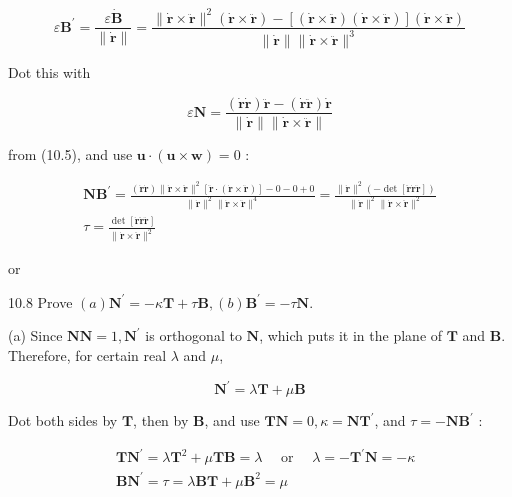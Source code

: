 \documentclass[10pt]{article}
\begin{document}
$$
\varepsilon \mathbf{B}^{\prime}=\frac{\varepsilon \dot{\mathbf{B}}}{\|\dot{\mathbf{r}}\|}=\frac{\|\dot{\mathbf{r}} \times \ddot{\mathbf{r}}\|^{2}(\dot{\mathbf{r}} \times \ddot{\mathbf{r}})-[(\dot{\mathbf{r}} \times \ddot{\mathbf{r}})(\dot{\mathbf{r}} \times \ddot{\mathbf{r}})](\dot{\mathbf{r}} \times \ddot{\mathbf{r}})}{\|\dot{\mathbf{r}}\|\|\dot{\mathbf{r}} \times \ddot{\mathbf{r}}\|^{3}}
$$

Dot this with

$$
\varepsilon \mathbf{N}=\frac{(\dot{\mathbf{r}} \dot{\mathbf{r}}) \ddot{\mathbf{r}}-(\dot{\mathbf{r}} \ddot{\mathbf{r}}) \dot{\mathbf{r}}}{\|\dot{\mathbf{r}}\|\|\dot{\mathbf{r}} \times \ddot{\mathbf{r}}\|}
$$

from (10.5), and use $\mathbf{u} \cdot(\mathbf{u} \times \mathbf{w})=0$ :

$$
\begin{gathered}
\mathbf{N B}^{\prime}=\frac{(\dot{\mathbf{r}} \dot{\mathbf{r}})\|\dot{\mathbf{r}} \times \ddot{\mathbf{r}}\|^{2}[\ddot{\mathbf{r}} \cdot(\dot{\mathbf{r}} \times \ddot{\mathbf{r}})]-0-0+0}{\|\dot{\mathbf{r}}\|^{2}\|\dot{\mathbf{r}} \times \ddot{\mathbf{r}}\|^{4}}=\frac{\|\dot{\mathbf{r}}\|^{2}(-\operatorname{det}[\ddot{\mathbf{r}} \dot{\mathbf{r}} \ddot{\mathbf{r}}])}{\|\dot{\mathbf{r}}\|^{2}\|\dot{\mathbf{r}} \times \ddot{\mathbf{r}}\|^{2}} \\
\tau=\frac{\operatorname{det}[\dot{\mathbf{r}} \ddot{\mathbf{r}} \ddot{\mathbf{r}}]}{\|\dot{\mathbf{r}} \times \ddot{\mathbf{r}}\|^{2}}
\end{gathered}
$$

or

10.8 Prove $(a) \mathbf{N}^{\prime}=-\kappa \mathbf{T}+\tau \mathbf{B},(b) \mathbf{B}^{\prime}=-\tau \mathbf{N}$.

(a) Since $\mathbf{N N}=1, \mathbf{N}^{\prime}$ is orthogonal to $\mathbf{N}$, which puts it in the plane of $\mathbf{T}$ and $\mathbf{B}$. Therefore, for certain real $\lambda$ and $\mu$,


\begin{equation*}
\mathbf{N}^{\prime}=\lambda \mathbf{T}+\mu \mathbf{B} \tag{1}
\end{equation*}


Dot both sides by $\mathbf{T}$, then by $\mathbf{B}$, and use $\mathbf{T N}=0, \kappa=\mathbf{N T}^{\prime}$, and $\tau=-\mathbf{N B}^{\prime}$ :

$$
\begin{aligned}
& \mathbf{T} \mathbf{N}^{\prime}=\lambda \mathbf{T}^{2}+\mu \mathbf{T B}=\lambda \quad \text { or } \quad \lambda=-\mathbf{T}^{\prime} \mathbf{N}=-\kappa \\
& \mathbf{B N}^{\prime}=\tau=\lambda \mathbf{B T}+\mu \mathbf{B}^{2}=\mu
\end{aligned}
$$
\end{document}
